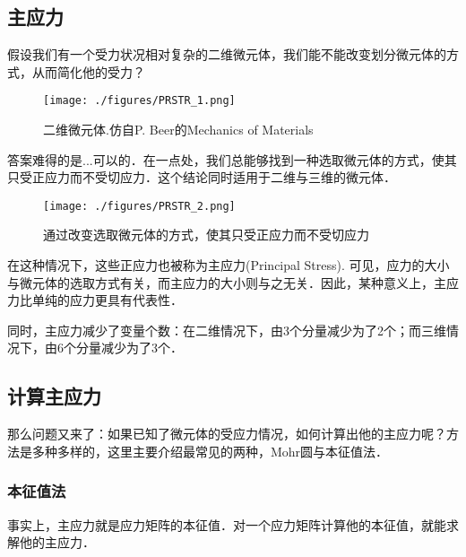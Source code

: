 
\begin{issues}
\issueDraft
\end{issues}

\subsection{主应力}
假设我们有一个受力状况相对复杂的二维微元体，我们能不能改变划分微元体的方式，从而简化他的受力？
\begin{figure}[ht]
\centering
\texttt{[image: ./figures/PRSTR\_1.png]}
\caption{二维微元体.仿自P. Beer的Mechanics of Materials} \label{PRSTR_fig1}
\end{figure}

答案难得的是...可以的．在一点处，我们总能够找到一种选取微元体的方式，使其只受正应力而不受切应力．这个结论同时适用于二维与三维的微元体．
\begin{figure}[ht]
\centering
\texttt{[image: ./figures/PRSTR\_2.png]}
\caption{通过改变选取微元体的方式，使其只受正应力而不受切应力} \label{PRSTR_fig2}
\end{figure}
在这种情况下，这些正应力也被称为主应力(Principal Stress). 可见，应力的大小与微元体的选取方式有关，而主应力的大小则与之无关．因此，某种意义上，主应力比单纯的应力更具有代表性．

同时，主应力减少了变量个数：在二维情况下，由3个分量减少为了2个；而三维情况下，由6个分量减少为了3个．

\subsection{计算主应力}
那么问题又来了：如果已知了微元体的受应力情况，如何计算出他的主应力呢？方法是多种多样的，这里主要介绍最常见的两种，Mohr圆与本征值法．

\subsubsection{本征值法}
事实上，主应力就是应力矩阵的本征值．对一个应力矩阵计算他的本征值，就能求解他的主应力．
